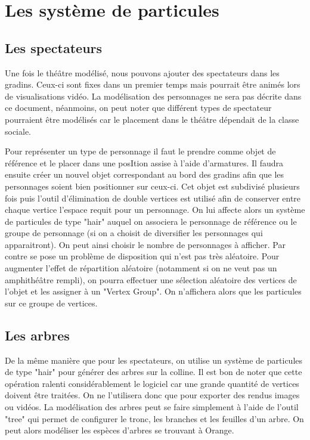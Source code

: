 \section{Les système de particules}
\subsection{Les spectateurs}
Une fois le théâtre modélisé, nous pouvons ajouter des spectateurs dans les gradins. Ceux-ci sont fixes dans un premier temps mais pourrait être animés lors de visualisations vidéo. La modélisation des personnages ne sera pas décrite dans ce document, néanmoins, on peut noter que différent types de spectateur pourraient être modélisés car le placement dans le théâtre dépendait de la classe sociale.

Pour représenter un type de personnage il faut le prendre comme objet de référence et le placer dans une posItion assise à l'aide d'\glspl{armature}. Il faudra ensuite créer un nouvel objet correspondant au bord des gradins afin que les personnages soient bien positionner sur ceux-ci. Cet objet est subdivisé plusieurs fois puis l'outil d'élimination de double vertices est utilisé afin de conserver entre chaque vertice l'espace requit pour un personnage. On lui affecte alors un système de \glspl{particule} de type "hair" auquel on associera le personnage de référence ou le groupe de personnage (si on a choisit de diversifier les personnages qui apparaitront). On peut ainsi choisir le nombre de personnages à afficher. Par contre se pose un problème de disposition qui n'est pas très aléatoire. Pour augmenter l'effet de répartition aléatoire (notamment si on ne veut pas un amphithéâtre rempli), on pourra effectuer une sélection aléatoire des vertices de l'objet et les assigner à un "Vertex Group". On n'affichera alors que les particules sur ce groupe de vertices. 


\subsection{Les arbres}
De la même manière que pour les spectateurs, on utilise un système de \glspl{particule} de type "hair" pour générer des arbres sur la colline. Il est bon de noter que cette opération ralenti considérablement le logiciel car une grande quantité de vertices doivent être traitées. On ne l'utilisera donc que pour exporter des rendus images ou vidéos. La modélisation des arbres peut se faire simplement à l'aide de l'outil "tree" qui permet de configurer le tronc, les branches et les feuilles d'un arbre. On peut alors modéliser les espèces d'arbres se trouvant à Orange.


